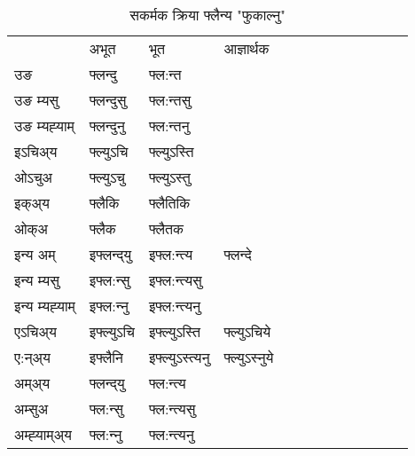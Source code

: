 \begin{table}[H]
\centering
\caption{\label{unt.vt} सकर्मक क्रिया  फ्लैन्य  "फुकाल्नु"  }
\begin{tabular}{l|l|l|l|l|l|l|l|l|l|l|l|l}  \toprule
&अभूत & भूत & आज्ञार्थक \\ 
उङ &फ्लन्दु &फ्ल:न्त \\ 
उङ म्यसु &फ्लन्दुसु &फ्ल:न्तसु \\ 
उङ म्यह्‍याम् &फ्लन्दुनु &फ्ल:न्तनु \\ 
इऽचिअ्य &फ्ल्युऽचि &फ्ल्युऽस्ति   \\ 
ओऽचुअ &फ्ल्युऽचु &फ्ल्युऽस्तु   \\ 
इक्अ्य &फ्लैकि &फ्लैतिकि   \\ 
ओक्अ &फ्लैक &फ्लैतक   \\ 
इन्य अम् & इफ्लन्द्‌यु  & इफ्ल:न्त्य &फ्लन्दे  \\ 
इन्य म्यसु & इफ्ल:न्सु  & इफ्ल:न्त्यसु   \\ 
इन्य म्यह्‍याम् & इफ्ल:न्‍नु  & इफ्ल:न्त्यनु   \\ 
एऽचिअ्य & इफ्ल्युऽचि & इफ्ल्युऽस्ति &फ्ल्युऽचिये    \\ 
ए:न्अ्य & इफ्लैनि  & इफ्ल्युऽस्त्यनु &फ्ल्युऽस्‍नुये  \\ 
अम्अ्य & फ्लन्द्‌यु  & फ्ल:न्त्य  \\ 
अम्सुअ & फ्ल:न्सु & फ्ल:न्त्यसु  \\ 
अम्ह्‍याम्अ्य & फ्ल:न्‍नु  & फ्ल:न्त्यनु \\ 
\bottomrule
\end{tabular}
\end{table}



